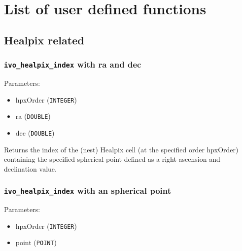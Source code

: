\documentclass[11pt,a4paper]{ivoa}
\begin{document}
\centering





\section{List of user defined functions}
\subsection{Healpix related}
\subsubsection{\texttt{ivo\_healpix\_index} with ra and dec}

Parameters:

\begin{itemize}
	\item hpxOrder (\texttt{INTEGER})
	\item ra (\texttt{DOUBLE})
	\item dec (\texttt{DOUBLE})
\end{itemize}

Returns the index of the (nest) Healpix cell (at the specified order
hpxOrder) containing the specified spherical point defined as a right
ascension and declination value.

\subsubsection{\texttt{ivo\_healpix\_index} with an spherical point}

Parameters:

\begin{itemize}
	\item hpxOrder (\texttt{INTEGER})
	\item point (\texttt{POINT})
\end{itemize}
\end{document}
